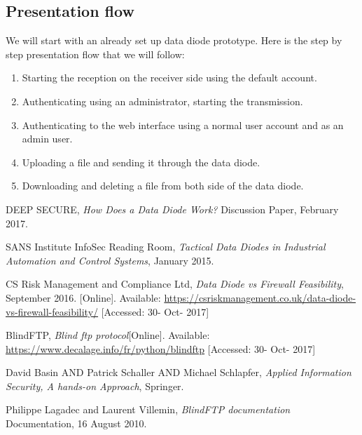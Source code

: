 \documentclass[a4paper,10pt]{article}
\begin{document}
\subsection{Presentation flow}
We will start with an already set up data diode prototype. Here is the step by step presentation flow that we will follow:
\begin{enumerate}
\item Starting the reception on the receiver side using the default account.
\item Authenticating using an administrator, starting the transmission.
\item Authenticating to the web interface using a normal user account and as an admin user.
\item Uploading a file and sending it through the data diode.
\item Downloading and deleting a file from both side of the data diode.
\end{enumerate}
 
\clearpage
\begin{thebibliography}{9}
DEEP SECURE,
\textit{How	Does a Data Diode Work?}
Discussion Paper, February 2017.

SANS Institute InfoSec Reading Room,
\textit{Tactical Data Diodes in Industrial Automation and Control Systems}, January 2015.

CS Risk Management and Compliance Ltd,
\textit{Data Diode vs Firewall Feasibility}, September 2016. [Online]. Available: \url{https://csriskmanagement.co.uk/data-diode-vs-firewall-feasibility/} [Accessed: 30- Oct- 2017]

BlindFTP,
\textit{Blind ftp protocol}[Online]. Available: \url{https://www.decalage.info/fr/python/blindftp} [Accessed: 30- Oct- 2017]

David Basin AND Patrick Schaller AND Michael Schlapfer,
\textit{Applied Information Security, A hands-on Approach},
Springer.

Philippe Lagadec and Laurent Villemin,
\textit{BlindFTP documentation}
Documentation,
16 August 2010.




\end{thebibliography}
\end{document}
